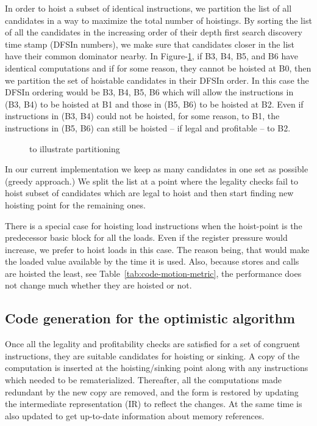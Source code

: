\documentclass[acmlarge,review,anonymous]{acmart}\settopmatter{printfolios=true}
\begin{document}
In order to hoist a subset of identical instructions, we partition the list of
all candidates in a way to maximize the total number of hoistings.  By sorting
the list of all the candidates in the increasing order of their depth first
search discovery time stamp \cite{clrs} (DFSIn numbers), we make sure that
candidates closer in the list have their common dominator nearby. In
Figure-\ref{fig:dfsin}, if B3, B4, B5, and B6 have identical computations and if
for some reason, they cannot be hoisted at B0, then we partition the set of
hoistable candidates in their DFSIn order. In this case the DFSIn ordering would
be B3, B4, B5, B6 which will allow the instructions in (B3, B4) to be hoisted at
B1 and those in (B5, B6) to be hoisted at B2. Even if instructions in (B3, B4)
could not be hoisted, for some reason, to B1, the instructions in (B5, B6) can
still be hoisted -- if legal and profitable -- to B2.

\begin{figure}
\centering
\caption{\CFG{} to illustrate partitioning}
\label{fig:dfsin}
\end{figure}

In our current implementation we keep as many candidates in one set as possible
(greedy approach.) We split the list at a point where the legality checks fail
to hoist subset of candidates which are legal to hoist and then start finding
new hoisting point for the remaining ones.


There is a special case for hoisting load instructions when the hoist-point is
the predecessor basic block for all the loads. Even if the register pressure
would increase, we prefer to hoist loads in this case. The reason being, that
would make the loaded value available by the time it is used. Also, because
stores and calls are hoisted the least, see Table~\ref{tab:code-motion-metric},
the performance does not change much whether they are hoisted or not.

\subsection{Code generation for the optimistic \gcm{} algorithm}
\label{subsec:optimistic}
Once all the legality and profitability checks are satisfied for a set of
congruent instructions, they are suitable candidates for hoisting or sinking. A
copy of the computation is inserted at the hoisting/sinking point along with any
instructions which needed to be rematerialized. Thereafter, all the computations
made redundant by the new copy are removed, and the \SSA{} form is restored by
updating the intermediate representation (IR) to reflect the changes. At the
same time \MemorySSA{} is also updated to get up-to-date information about
memory references.
\end{document}
